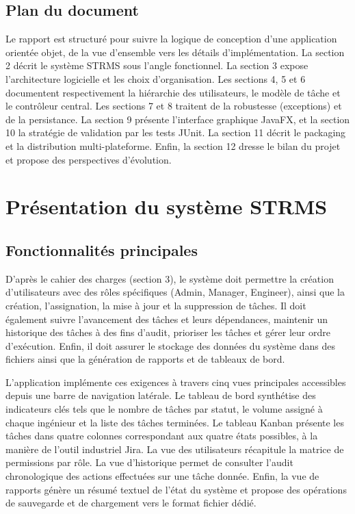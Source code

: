 \documentclass[11pt]{article}
\begin{document}
\subsection{Plan du document}
Le rapport est structuré pour suivre la logique de conception d'une
application orientée objet, de la vue d'ensemble vers les détails
d'implémentation. La section 2 décrit le système STRMS sous l'angle
fonctionnel. La section 3 expose l'architecture logicielle et les choix
d'organisation. Les sections 4, 5 et 6 documentent respectivement la
hiérarchie des utilisateurs, le modèle de tâche et le contrôleur central.
Les sections 7 et 8 traitent de la robustesse (exceptions) et de la
persistance. La section 9 présente l'interface graphique JavaFX, et la
section 10 la stratégie de validation par les tests JUnit. La section 11
décrit le packaging et la distribution multi-plateforme. Enfin, la section
12 dresse le bilan du projet et propose des perspectives d'évolution.

\section{Présentation du système STRMS}

\subsection{Fonctionnalités principales}
D'après le cahier des charges (section 3), le système doit permettre la
création d'utilisateurs avec des rôles spécifiques (Admin, Manager,
Engineer), ainsi que la création, l'assignation, la mise à jour et la
suppression de tâches. Il doit également suivre l'avancement des tâches et
leurs dépendances, maintenir un historique des tâches à des fins d'audit,
prioriser les tâches et gérer leur ordre d'exécution. Enfin, il doit
assurer le stockage des données du système dans des fichiers ainsi que la
génération de rapports et de tableaux de bord.

L'application implémente ces exigences à travers cinq vues principales
accessibles depuis une barre de navigation latérale. Le tableau de bord
synthétise des indicateurs clés tels que le nombre de tâches par statut, le
volume assigné à chaque ingénieur et la liste des tâches terminées. Le
tableau Kanban présente les tâches dans quatre colonnes correspondant aux
quatre états possibles, à la manière de l'outil industriel Jira. La vue
des utilisateurs récapitule la matrice de permissions par rôle. La vue
d'historique permet de consulter l'audit chronologique des actions
effectuées sur une tâche donnée. Enfin, la vue de rapports génère un
résumé textuel de l'état du système et propose des opérations de
sauvegarde et de chargement vers le format fichier dédié.
\end{document}

